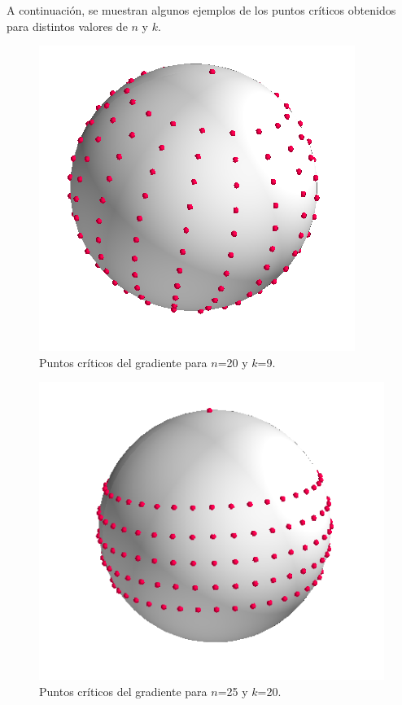 A continuación, se muestran algunos ejemplos de los puntos críticos obtenidos para distintos valores de $n$ y $k$.
\begin{figure}[H]
	\centering
	\includegraphics[scale=0.4]{img/gradient_20_9.png}
	\caption{Puntos críticos del gradiente para $n$=20 y $k$=9.}
\end{figure}

\begin{figure}[H]
	\centering
	\includegraphics[scale=0.5]{img/gradient_25_5.png}
	\caption{Puntos críticos del gradiente para $n$=25 y $k$=20.}
\end{figure}

